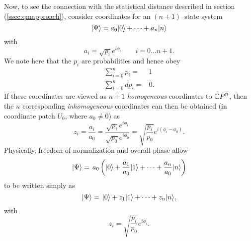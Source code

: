 Now, to see the connection with the statistical distance described
in section (\ref{ssec:qmapproach}),
consider coordinates for an $(n+1)$--state system
\begin{equation}
{|{\Psi}\rangle} = a_0{|{0}\rangle} + \cdots + a_n{|{n}\rangle}
\end{equation} 
with
\begin{equation}
a_i = \sqrt{p_i}e^{i\phi_i}\qquad i=0\ldots n+1.
\end{equation}
We note here that the $p_i$ are probabilities and hence obey
\begin{equation}
\begin{split}
\sum_{i=0}^{n} p_i =& 1\\
\sum_{i=0}^{n} dp_i =& 0.
\end{split}
\end{equation}
If these coordinates are viewed as $n+1$ \emph{homogeneous}
coordinates to ${\mathbb{C} P}^{n}$, then the $n$ corresponding 
\emph{inhomogeneous} coordinates can then be obtained
(in coordinate patch $U_0$, where $a_0\ne 0$) as
\begin{equation}
z_i = \frac{a_i}{a_0} = \frac{ \sqrt{p_i}e^{i\phi_i} }
                             { \sqrt{p_0}e^{i\phi_0} }
= \sqrt{\frac{p_i}{p_0}} e^{i(\phi_i - \phi_0)}.
\label{e:inhomoA}
\end{equation}
Physically, freedom of normalization and overall phase allow
\begin{equation} 
{|{\Psi}\rangle} =\, a_0\left( {|{0}\rangle} + \frac{a_1}{a_0}{|{1}\rangle} + \cdots 
                        + \frac{a_n}{a_0}{|{n}\rangle}
                \right)
\end{equation}
to be written simply as
\begin{equation}
{|{\Psi}\rangle}  =\, {|{0}\rangle} + z_1{|{1}\rangle} + \cdots + z_n{|{n}\rangle},
\end{equation}
with
\begin{equation}
z_i = \sqrt{\frac{p_i}{p_0}} e^{i\phi_i}.
\label{e:inhomoB}
\end{equation}

